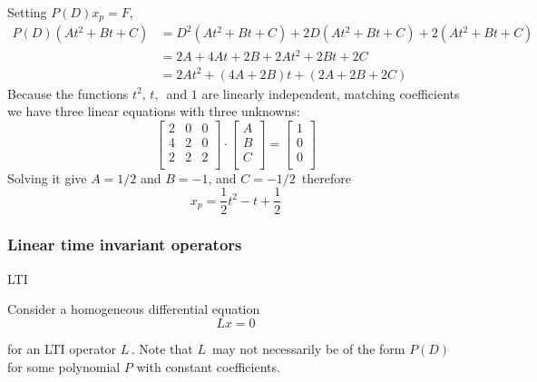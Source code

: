 \begin{enumerate}
    Setting $P(D)x_ p= F$,
    \begin{align*}
      P(D)(At^2+Bt+C)
      &= D^2(At^2+Bt+C) + 2D(At^2+Bt+C) + 2(At^2+Bt+C) \\
      &= 2A + 4At + 2B + 2At^2 + 2Bt + 2C \\
      &= 2At^2 + (4A + 2B)t + (2A + 2B + 2C)                        
    \end{align*}
    Because the functions $t^2,\, t,\, $ and $1$ are linearly independent,
    matching coefficients we have three linear equations with three unknowns:
    \[
      \begin{bmatrix}
        2 & 0 & 0 \\
        4 & 2 & 0 \\
        2 & 2 & 2 \\
      \end{bmatrix}
      \cdot
      \begin{bmatrix}
        A \\
        B \\
        C \\
      \end{bmatrix}
      =
      \begin{bmatrix}
        1 \\
        0 \\
        0 \\
      \end{bmatrix}
    \]   
    Solving it give $A = 1/2$ and $B = -1$, and $C =-1/2 \,$ therefore
    \begin{equation*}
      x _p = \frac{1}{2} t^2  - t + \frac{1}{2}  
    \end{equation*}
\end{enumerate}

\clearpage
\subsubsection{Linear time invariant operators}

\begin{problem}
  LTI
\end{problem}

Consider a homogeneous differential equation
\begin{equation*}
  L x = 0
\end{equation*}

for an LTI operator $L\,$.
Note that $L\,$ may not necessarily be of the form $P(D)\,$
for some polynomial $P$ with constant coefficients.\\

